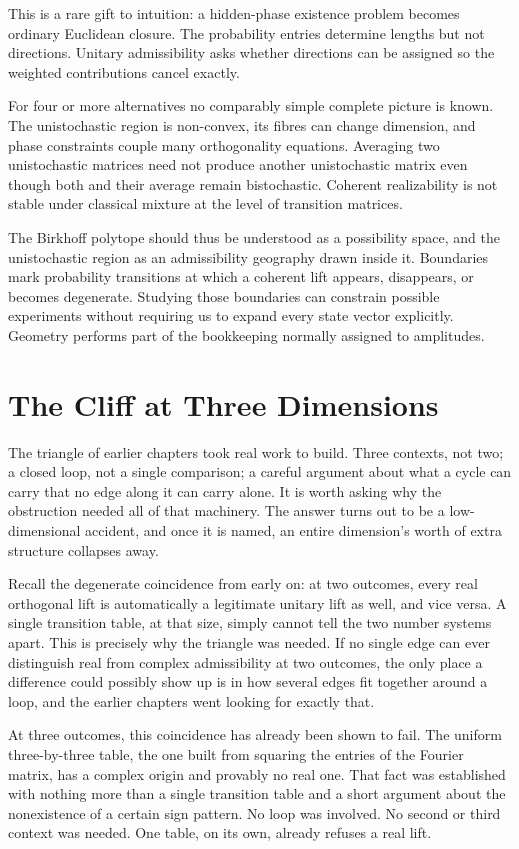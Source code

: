 \documentclass[12pt,openany]{book}
\begin{document}
This is a rare gift to intuition: a hidden-phase existence problem becomes ordinary Euclidean closure. The probability entries determine lengths but not directions. Unitary admissibility asks whether directions can be assigned so the weighted contributions cancel exactly.

For four or more alternatives no comparably simple complete picture is known. The unistochastic region is non-convex, its fibres can change dimension, and phase constraints couple many orthogonality equations. Averaging two unistochastic matrices need not produce another unistochastic matrix even though both and their average remain bistochastic. Coherent realizability is not stable under classical mixture at the level of transition matrices.

The Birkhoff polytope should thus be understood as a possibility space, and the unistochastic region as an admissibility geography drawn inside it. Boundaries mark probability transitions at which a coherent lift appears, disappears, or becomes degenerate. Studying those boundaries can constrain possible experiments without requiring us to expand every state vector explicitly. Geometry performs part of the bookkeeping normally assigned to amplitudes.

\chapter{The Cliff at Three Dimensions}

The triangle of earlier chapters took real work to build. Three contexts, not two; a closed loop, not a single comparison; a careful argument about what a cycle can carry that no edge along it can carry alone. It is worth asking why the obstruction needed all of that machinery. The answer turns out to be a low-dimensional accident, and once it is named, an entire dimension's worth of extra structure collapses away.

Recall the degenerate coincidence from early on: at two outcomes, every real orthogonal lift is automatically a legitimate unitary lift as well, and vice versa. A single transition table, at that size, simply cannot tell the two number systems apart. This is precisely why the triangle was needed. If no single edge can ever distinguish real from complex admissibility at two outcomes, the only place a difference could possibly show up is in how several edges fit together around a loop, and the earlier chapters went looking for exactly that.

At three outcomes, this coincidence has already been shown to fail. The uniform three-by-three table, the one built from squaring the entries of the Fourier matrix, has a complex origin and provably no real one. That fact was established with nothing more than a single transition table and a short argument about the nonexistence of a certain sign pattern. No loop was involved. No second or third context was needed. One table, on its own, already refuses a real lift.
\end{document}
